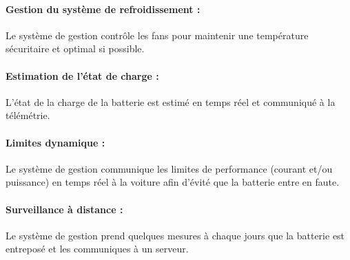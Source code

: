 			\paragraph{Gestion du système de refroidissement :} 
			Le système de gestion contrôle les fans pour maintenir une température sécuritaire et optimal si possible.
			
			\paragraph{Estimation de l'état de charge :}
			L'état de la charge de la batterie est estimé en temps réel et communiqué à la télémétrie.
			
			\paragraph{Limites dynamique :}
			Le système de gestion communique les limites de performance (courant et/ou puissance) en temps réel à la voiture afin d’évité que la batterie entre en faute.
			
			\paragraph{Surveillance à distance :}
			Le système de gestion prend quelques mesures à chaque jours que la batterie est entreposé et les communiques à un serveur.		
		
